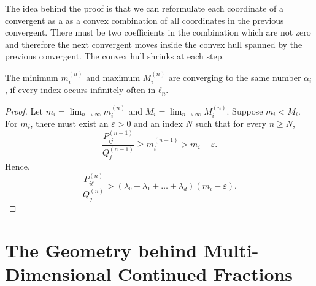 \iffalse
  From the proof of the previous lemma, we can easily deduce that the sequences
  $m_i^{(n)}$ and $M_i^{(n)}$ must be converging to some number $m_i$ and $M_i$,
  respectively.
  However, it does not necessarily follow that the ratios in $r^{(n)}$ are also converging.
  This is because the minimum $m_i^{(n)}$ and the maximum $M_i^{(n)}$ might converge to different numbers $m ≠ M$
  and the ratios could therefore oscillate between a set of values between $m_i$ and $M_i$.
  For example, suppose the minimum $m^{(i)}$ is $r_j^{(n)}$ for some index $j$.
  The minimum changes only when $ℓ_{n'} = j$ for some $n' ≥ n$.
  But it might be the case that the other values in $r^{(n)}$ are still smaller
  than $r_j^{(n')}$ even after updating.
  Therefore, the minimum always tracks the same value in $r^{(n)}$.
  The same argument can be made for the maximum.
  But then these values don't necessarily have to assume the same value.
  The following lemma shows that this is not the case:
\fi

The idea behind the proof is that we can reformulate each coordinate of a
convergent as a as a convex combination of all coordinates in the previous
convergent.
There must be two coefficients in the combination which are not zero
and therefore the next convergent moves inside the convex hull spanned by the previous convergent.
The convex hull shrinks at each step.

\begin{lemma}
  The minimum $m_i^{(n)}$ and maximum $M_i^{(n)}$ are converging to the same
  number $α_i$, if every index occurs infinitely often in $ℓ_n$.
\end{lemma}

\begin{proof}
  Let $m_i = \lim_{n → ∞} m_i^{(n)}$
  and $M_i = \lim_{n → ∞} M_i^{(n)}$.
  Suppose $m_i < M_i$.
  For $m_i$, there must exist an $ε > 0$ and an index $N$ such that for every $n ≥ N$,
  \[
    \frac{P_{ij}^{(n-1)}}{Q_j^{(n-1)}} ≥ m_i^{(n-1)} > m_i - ε.
  \]
  Hence,
  \[
    \frac{P_{iℓ}^{(n)}}{Q_j^{(n)}} > (λ₀ + λ₁ + \dots + λ_d) (m_i - ε).
  \]
\end{proof}

\section{The Geometry behind Multi-Dimensional Continued Fractions}

